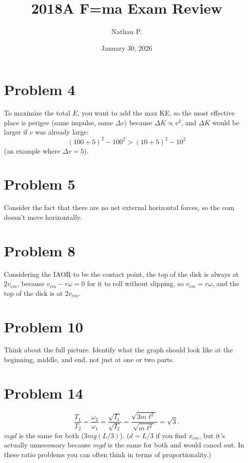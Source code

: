 \documentclass[11pt]{article}
\title{2018A F=ma Exam Review}
\author{Nathan P.}
\date{January 30, 2026}
\begin{document}
\maketitle

\section*{Problem 4}
To maximize the total $E$, you want to add the max KE, so the most effective place is perigee (same impulse, same $\Delta v$) because $\Delta K\propto v^2$, and $\Delta K$ would be larger if $v$ was already large:
\[
(100+5)^2-100^2>(10+5)^2-10^2
\]
(an example where $\Delta v=5$).

\section*{Problem 5}
Consider the fact that there are no net external horizontal forces, so the com doesn't move horizontally.

\section*{Problem 8}
Considering the IAOR to be the contact point, the top of the disk is always at $2v_{cm}$, because $v_{cm}-r\omega=0$ for it to roll without slipping, so $v_{cm}=r\omega$, and the top of the disk is at $2v_{cm}$.

\begin{center}
\end{center}

\section*{Problem 10}
Think about the full picture. Identify what the graph should look like at the beginning, middle, and end, not just at one or two parts.

\section*{Problem 14}
\[
\frac{T_1}{T_2}=\frac{\omega_2}{\omega_1}=\frac{\sqrt{I_1}}{\sqrt{I_2}}=\frac{\sqrt{3m\ell^2}}{\sqrt{m\ell^2}}=\sqrt3.
\]
$mgd$ is the same for both ($3mg(L/3)$). ($d=L/3$ if you find $x_{cm}$, but it's actually unnecessary because $mgd$ is the same for both and would cancel out. In these ratio problems you can often think in terms of proportionality.)
\end{document}

